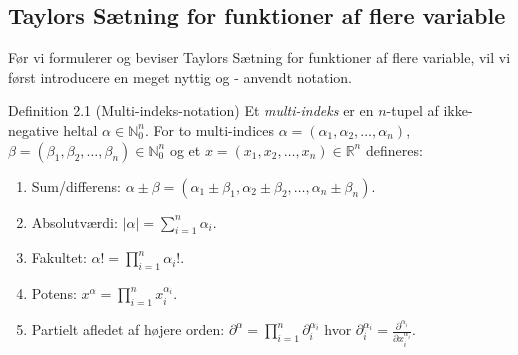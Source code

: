 \subsection{Taylors Sætning for funktioner af flere variable}
Før vi formulerer og beviser Taylors Sætning for funktioner af flere variable, vil vi først introducere en meget nyttig og - anvendt notation.
\begin{boks}{Definition 2.1 (Multi-indeks-notation)}
  Et \textit{multi-indeks} er en $n$-tupel af ikke-negative heltal $\alpha \in \mathbb{N}_0^n$. For to multi-indices $\alpha = (\alpha_1, \alpha_2, \ldots, \alpha_n)$, $\beta = (\beta_1, \beta_2, \ldots, \beta_n) \in \mathbb{N}_0^n$ og et $x = (x_1, x_2, \ldots, x_n) \in \mathbb{R}^n$ defineres:
  \begin{enumerate}[label = \arabic*.]
    \item Sum/differens: $\alpha \pm \beta = (\alpha_1 \pm \beta_1, \alpha_2 \pm \beta_2, \ldots, \alpha_n \pm \beta_n).$
    \item  Absolutværdi: $|\alpha| = \sum_{i = 1}^n \alpha_i.$
    \item Fakultet: $\alpha! = \prod_{i = 1}^n \alpha_i!.$
    \item Potens: $x^\alpha = \prod_{i = 1}^n x_i^{\alpha_i}.$
    \item Partielt afledet af højere orden: $\partial^\alpha = \prod_{i = 1}^n \partial_i^{\alpha_i}$ hvor $\partial_i^{\alpha_i} = \frac{\partial^{\alpha_i}}{\partial x_i^{\alpha_i}}.$
  \end{enumerate}
\end{boks}

